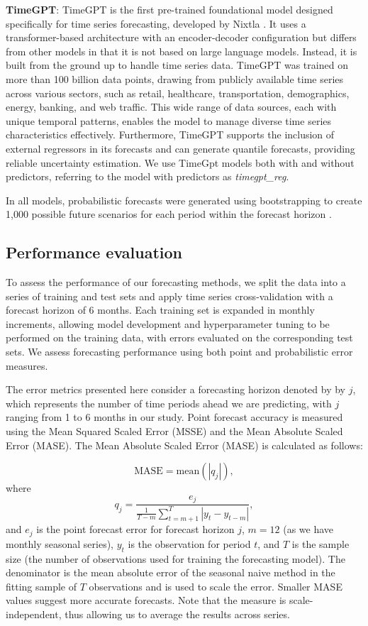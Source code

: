 \documentclass[
  authoryear,
  preprint,
  3p]{elsarticle}
\begin{document}
\textbf{TimeGPT}: TimeGPT is the first pre-trained foundational model
designed specifically for time series forecasting, developed by Nixtla
\citep{garza2023timegpt}. It uses a transformer-based architecture with
an encoder-decoder configuration but differs from other models in that
it is not based on large language models. Instead, it is built from the
ground up to handle time series data. TimeGPT was trained on more than
100 billion data points, drawing from publicly available time series
across various sectors, such as retail, healthcare, transportation,
demographics, energy, banking, and web traffic. This wide range of data
sources, each with unique temporal patterns, enables the model to manage
diverse time series characteristics effectively. Furthermore, TimeGPT
supports the inclusion of external regressors in its forecasts and can
generate quantile forecasts, providing reliable uncertainty estimation.
We use TimeGpt models both with and without predictors, referring to the
model with predictors as \emph{timegpt\_reg}.

In all models, probabilistic forecasts were generated using
bootstrapping to create 1,000 possible future scenarios for each period
within the forecast horizon \citep{hyndman2021forecasting}.

\subsection{Performance evaluation}\label{performance-evaluation}

To assess the performance of our forecasting methods, we split the data
into a series of training and test sets and apply time series
cross-validation with a forecast horizon of 6 months. Each training set
is expanded in monthly increments, allowing model development and
hyperparameter tuning to be performed on the training data, with errors
evaluated on the corresponding test sets. We assess forecasting
performance using both point and probabilistic error measures.

The error metrics presented here consider a forecasting horizon denoted
by by \(j\), which represents the number of time periods ahead we are
predicting, with \(j\) ranging from 1 to 6 months in our study. Point
forecast accuracy is measured using the Mean Squared Scaled Error (MSSE)
and the Mean Absolute Scaled Error (MASE). The Mean Absolute Scaled
Error (MASE) \citep{HK06, hyndman2021forecasting} is calculated as
follows:

\[
  \text{MASE} = \text{mean}(|q_{j}|),
\] where \[
  q_{j} = \frac{ e_{j}}
 {\displaystyle\frac{1}{T-m}\sum_{t=m+1}^T |y_{t}-y_{t-m}|},
\] and \(e_{j}\) is the point forecast error for forecast horizon \(j\),
\(m = 12\) (as we have monthly seasonal series), \(y_t\) is the
observation for period \(t\), and \(T\) is the sample size (the number
of observations used for training the forecasting model). The
denominator is the mean absolute error of the seasonal naive method in
the fitting sample of \(T\) observations and is used to scale the error.
Smaller MASE values suggest more accurate forecasts. Note that the
measure is scale-independent, thus allowing us to average the results
across series.
\end{document}
